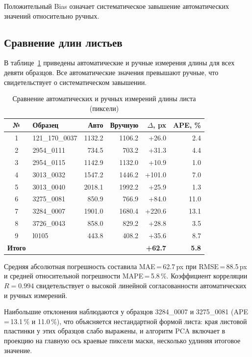Положительный Bias означает систематическое завышение автоматических значений относительно ручных.

\subsection{Сравнение длин листьев}

В таблице~\ref{tab:lengths} приведены автоматические и ручные измерения длины для всех девяти образцов.
Все автоматические значения превышают ручные, что свидетельствует о систематическом завышении.

\begin{table}[H]
\centering
\caption{Сравнение автоматических и ручных измерений длины листа (пиксели)}
\label{tab:lengths}
\begin{tabular}{clrrrr}
\hline
\textbf{№} & \textbf{Образец} & \textbf{Авто} & \textbf{Вручную} & $\Delta$, px & APE, \% \\
\hline
1 & 121\_170\_0037 & 1132.2 & 1106.2 & +26.0  &  2.4 \\
2 & 2954\_0111     &  734.5 &  703.2 & +31.3  &  4.4 \\
3 & 2954\_0115     & 1142.9 & 1132.0 & +10.9  &  1.0 \\
4 & 3013\_0032     & 1547.2 & 1446.2 & +101.0 &  7.0 \\
5 & 3013\_0040     & 2018.1 & 1992.2 & +25.9  &  1.3 \\
6 & 3275\_0081     &  850.9 &  766.9 & +84.0  & 11.0 \\
7 & 3284\_0007     & 1901.0 & 1680.4 & +220.6 & 13.1 \\
8 & 3726\_0043     &  858.0 &  829.2 & +28.8  &  3.5 \\
9 & l0105          &  443.8 &  408.2 & +35.6  &  8.7 \\
\hline
\textbf{Итого} & & & & \textbf{+62.7} & \textbf{5.8} \\
\hline
\end{tabular}
\end{table}

Средняя абсолютная погрешность составила MAE\,=\,62.7\,px при RMSE\,=\,88.5\,px
и средней относительной погрешности MAPE\,=\,5.8\,\%.
Коэффициент корреляции $R = 0.994$ свидетельствует о высокой линейной согласованности
автоматических и ручных измерений.

Наибольшие отклонения наблюдаются у образцов 3284\_0007 и 3275\_0081 (APE\,=\,13.1\,\% и 11.0\,\%),
что объясняется нестандартной формой листа: края листовой пластинки у этих образцов слабо
выражены, и алгоритм PCA включает в проекцию на главную ось краевые пиксели маски,
несколько удлиняя итоговое значение.

